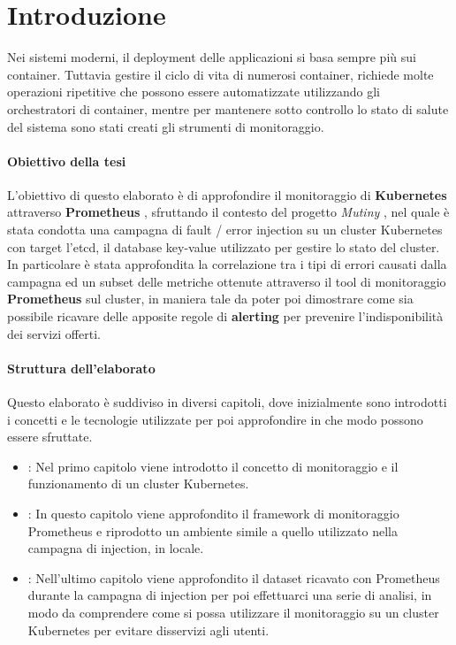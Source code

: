\chapter*{Introduzione}


Nei sistemi moderni, il deployment delle applicazioni si basa sempre più sui container. Tuttavia gestire il ciclo di vita di numerosi container, richiede molte operazioni ripetitive che possono essere automatizzate utilizzando gli orchestratori di container, mentre per mantenere sotto controllo lo stato di salute del sistema sono stati creati gli strumenti di monitoraggio.

\subsubsection{Obiettivo della tesi}
L'obiettivo di questo elaborato è di approfondire il monitoraggio di \textbf{Kubernetes} \cite{Kubernetes} attraverso \textbf{Prometheus} \cite{Prometheus}, sfruttando il contesto del progetto \textit{Mutiny} \cite{Paper}, nel quale è stata condotta una campagna di fault / error injection su un cluster Kubernetes  con target l'etcd, il database key-value utilizzato per gestire lo stato del cluster.
\\
In particolare è stata approfondita la correlazione tra i tipi di errori causati dalla campagna ed un subset delle metriche ottenute attraverso il tool di monitoraggio \textbf{Prometheus} sul cluster, in maniera tale da poter poi dimostrare come sia possibile ricavare delle apposite regole di \textbf{alerting} per prevenire l'indisponibilità dei servizi offerti.

\subsubsection{Struttura dell'elaborato}
Questo elaborato è suddiviso in diversi capitoli, dove inizialmente sono introdotti i concetti e le tecnologie utilizzate per poi approfondire in che modo possono essere sfruttate.

\begin{itemize}
    \item \textbf{}: Nel primo capitolo viene introdotto il concetto di monitoraggio e il funzionamento di un cluster Kubernetes.
    \item \textbf{}: In questo capitolo viene approfondito il framework di monitoraggio Prometheus e riprodotto un ambiente simile a quello utilizzato nella campagna di injection, in locale.
    \item \textbf{}: Nell'ultimo capitolo viene approfondito il dataset ricavato con Prometheus durante la campagna di injection per poi effettuarci una serie di analisi, in modo da comprendere come si possa utilizzare il monitoraggio su un cluster Kubernetes per evitare disservizi agli utenti.
\end{itemize}